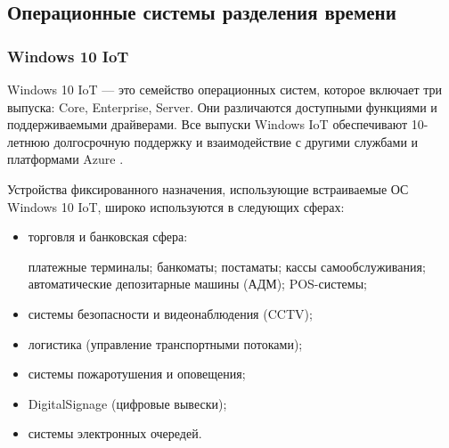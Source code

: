 \subsection{Операционные системы разделения времени}



\subsubsection{Windows 10 IoT}




Windows 10 IoT \cite{Windows_IoT_overview} \cite{OS_questions} --- это семейство операционных систем, которое включает три выпуска: Core, Enterprise, Server.
Они различаются доступными функциями и поддерживаемыми драйверами. Все выпуски Windows IoT обеспечивают 10-летнюю долгосрочную поддержку и взаимодействие с другими службами и платформами Azure \cite{Azure_sevices}.

Устройства фиксированного назначения, использующие встраиваемые ОС Windows 10 IoT, широко используются в следующих сферах:

\begin{itemize}[label*=---]
	\item торговля и банковская сфера:
	
		\subitem платежные терминалы;
		\subitem банкоматы;
		\subitem постаматы;
		\subitem кассы самообслуживания;
		\subitem автоматические депозитарные машины (АДМ);
		\subitem POS-системы;
	
	\item системы безопасности и видеонаблюдения (CCTV);
	\item логистика (управление транспортными потоками);
	\item системы пожаротушения и оповещения;
	\item DigitalSignage (цифровые вывески);
	\item системы электронных очередей.
\end{itemize}

